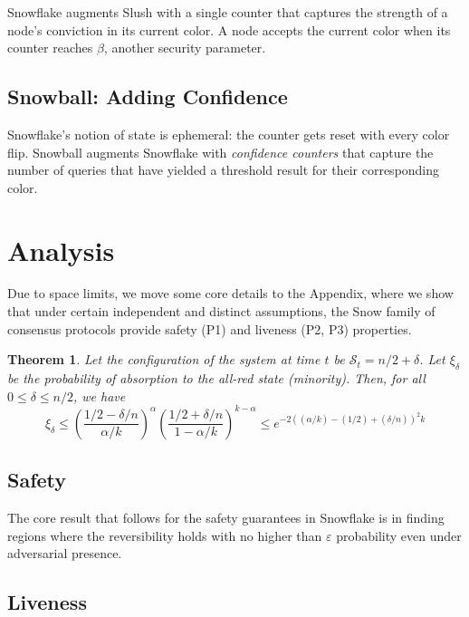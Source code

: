 \documentclass[11pt]{article}
\newtheorem{theorem}{Theorem}[section]
\begin{document}
Snowflake augments Slush with a single counter that captures
the strength of a node's conviction in its current color.
A node accepts the current color when its counter reaches $\beta$, another
security parameter.

\subsection{Snowball: Adding Confidence}

Snowflake's notion of state is ephemeral: the counter gets
reset with every color flip. Snowball augments Snowflake with
\emph{confidence counters} that capture the number of queries that
have yielded a threshold result for their corresponding color.

\section{Analysis}\label{sec:analysis}

Due to space limits, we move some core details to the Appendix,
where we show that under certain independent and distinct
assumptions, the Snow family of consensus protocols provide
safety (P1) and liveness (P2, P3) properties.

\begin{theorem}
Let the configuration of the system at time $t$ be
$\mathcal{S}_t = n/2 + \delta$. Let $\xi_\delta$ be the probability of absorption to the all-red
state (minority). Then, for all $0 \leq \delta \leq n/2$, we have
\begin{equation}
\xi_\delta \leq \left(\frac{1/2 - \delta/n}{\alpha/k}\right)^\alpha \left(\frac{1/2 + \delta/n}{1 - \alpha/k}\right)^{k-\alpha}
\leq e^{-2((\alpha/k) - (1/2) + (\delta/n))^2 k}
\end{equation}
\end{theorem}

\subsection{Safety}

The core result that follows
for the safety guarantees in Snowflake is in finding regions
where the reversibility
holds with no higher than $\varepsilon$ probability even under adversarial
presence.

\subsection{Liveness}
\end{document}
